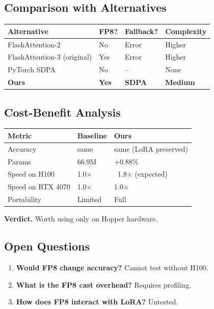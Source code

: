 \subsection{Comparison with Alternatives}

\begin{table}[H]
\centering
\small
\begin{tabular}{llll}
\toprule
\textbf{Alternative} & \textbf{FP8?} & \textbf{Fallback?} & \textbf{Complexity} \\
\midrule
FlashAttention-2 & No & Error & Higher \\
FlashAttention-3 (original) & Yes & Error & Higher \\
PyTorch SDPA & No & -- & None \\
\textbf{Ours} & \textbf{Yes} & \textbf{SDPA} & \textbf{Medium} \\
\bottomrule
\end{tabular}
\end{table}

\subsection{Cost-Benefit Analysis}

\begin{table}[H]
\centering
\small
\begin{tabular}{lll}
\toprule
\textbf{Metric} & \textbf{Baseline} & \textbf{Ours} \\
\midrule
Accuracy & same & same (LoRA preserved) \\
Params & 66.9M & +0.88\% \\
Speed on H100 & 1.0$\times$ & ~1.8$\times$ (expected) \\
Speed on RTX 4070 & 1.0$\times$ & 1.0$\times$ \\
Portability & Limited & Full \\
\bottomrule
\end{tabular}
\end{table}

\textbf{Verdict.} Worth using only on Hopper hardware.

\subsection{Open Questions}

\begin{enumerate}
\item \textbf{Would FP8 change accuracy?} Cannot test without H100.
\item \textbf{What is the FP8 cast overhead?} Requires profiling.
\item \textbf{How does FP8 interact with LoRA?} Untested.

\end{enumerate}
